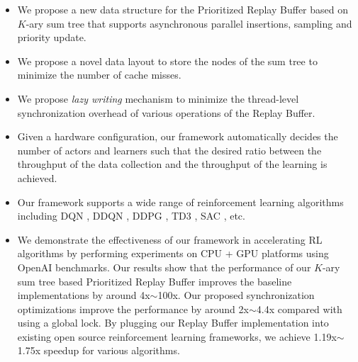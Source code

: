 \begin{itemize}
    \item We propose a new data structure for the Prioritized Replay Buffer based on $K$-ary sum tree that supports asynchronous parallel insertions, sampling and priority update.
    \item We propose a novel data layout to store the nodes of the sum tree to minimize the number of cache misses.
    \item We propose \textit{lazy writing} mechanism to minimize the thread-level synchronization overhead of various operations of the Replay Buffer.
    \item Given a hardware configuration, our framework automatically decides the number of actors and learners such that the desired ratio between the throughput of the data collection and the throughput of the learning is achieved.
    \item Our framework supports a wide range of reinforcement learning algorithms including DQN \cite{dqn}, DDQN \cite{double_q_learning}, DDPG \cite{ddpg}, TD3 \cite{td3}, SAC \cite{sac}, etc.
    \item We demonstrate the effectiveness of our framework in accelerating RL algorithms by performing experiments on CPU + GPU platforms using OpenAI \cite{openai_gym} benchmarks. Our results show that the performance of our $K$-ary sum tree based Prioritized Replay Buffer improves the baseline implementations by around 4x$\sim$100x. Our proposed synchronization optimizations improve the performance by around 2x$\sim$4.4x compared with using a global lock. By plugging our Replay Buffer implementation into existing open source reinforcement learning frameworks, we achieve 1.19x$\sim$1.75x speedup for various algorithms.
\end{itemize}







